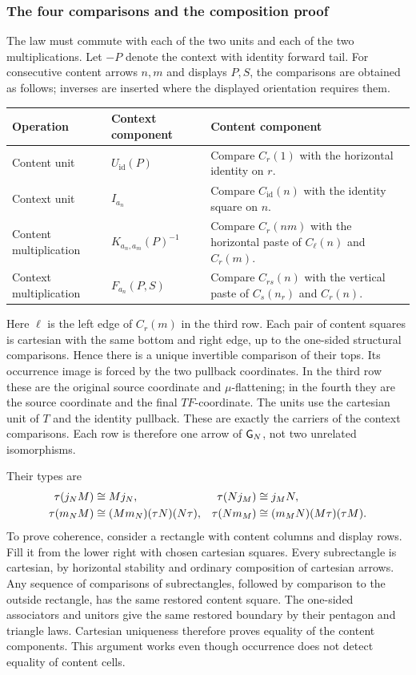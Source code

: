 \documentclass[11pt]{article}
\numberwithin{equation}{section}
\theoremstyle{definition}\newtheorem{definition}[theorem]{Definition}
\newcommand{\id}{\mathrm{id}}\newcommand{\op}{\mathrm{op}}\newcommand{\dom}{\mathrm{dom}}\newcommand{\cod}{\mathrm{cod}}
\begin{document}
\subsubsection{The four comparisons and the composition proof}
The law must commute with each of the two units and each of the two
multiplications. Let $-P$ denote the context with identity forward tail.
For consecutive content arrows $n,m$ and displays $P,S$, the comparisons
are obtained as follows; inverses are inserted where the displayed
orientation requires them.
\begin{center}\small
\begin{tabular}{@{}p{.14\linewidth}p{.28\linewidth}p{.51\linewidth}@{}}
\toprule
Operation&Context component&Content component\\\midrule
Content unit&$U_{\id}(P)$&Compare $C_r(1)$ with the horizontal identity on $r$.\\[3pt]
Context unit&$I_{a_n}$&Compare $C_{\id}(n)$ with the identity square on $n$.\\[3pt]
Content multiplication&$K_{a_n,a_m}(P)^{-1}$&Compare $C_r(nm)$ with the horizontal paste of $C_\ell(n)$ and $C_r(m)$.\\[3pt]
Context multiplication&$F_{a_n}(P,S)$&Compare $C_{rs}(n)$ with the vertical paste of $C_s(n_r)$ and $C_r(n)$.\\\bottomrule
\end{tabular}
\end{center}
Here $\ell$ is the left edge of $C_r(m)$ in the third row. Each pair of
content squares is cartesian with the same bottom and right edge, up to
the one-sided structural comparisons. Hence there is a unique invertible
comparison of their tops. Its occurrence image is forced by the two
pullback coordinates. In the third row these are the original source
coordinate and $\mu$-flattening; in the fourth they are the source
coordinate and the final $TF$-coordinate. The units use the cartesian
unit of $T$ and the identity pullback. These are exactly the carriers
of the context comparisons. Each row is therefore one arrow of
$\mathsf G_N$, not two unrelated isomorphisms.

Their types are
\begin{align}
 \tau(j_NM)&\cong Mj_N,&\tau(Nj_M)&\cong j_MN,\notag\\
 \tau(m_NM)&\cong(Mm_N)(\tau N)(N\tau),&
 \tau(Nm_M)&\cong(m_MN)(M\tau)(\tau M).\label{eq:four}
\end{align}
To prove coherence, consider a rectangle with content columns and display
rows. Fill it from the lower right with chosen cartesian squares. Every
subrectangle is cartesian, by horizontal stability and ordinary
composition of cartesian arrows. Any sequence of comparisons of
subrectangles, followed by comparison to the outside rectangle, has the
same restored content square. The one-sided associators and unitors give
the same restored boundary by their pentagon and triangle laws. Cartesian
uniqueness therefore proves equality of the content components. This
argument works even though occurrence does not detect equality of content
cells.
\end{document}
